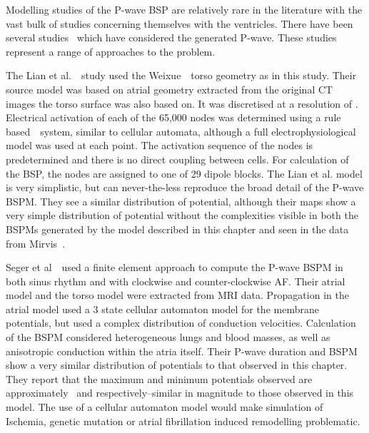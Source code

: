 Modelling studies of the P-wave BSP are relatively rare in the literature with
the vast bulk of studies concerning themselves with the ventricles.
There have been several
studies~\cite{Lian2002,Seger2004,Oosterom2005,vanDam2005} which have considered
the generated P-wave.
These studies represent a range of approaches to the problem.

The Lian et al.~\cite{Lian2002}\ study used the Weixue~\cite{Lu1993,Weixue1996}\ torso
geometry as in this study.
Their source model was based on atrial geometry extracted from the original CT
images the torso surface was also based on.
It was discretised at a resolution of .
Electrical activation of each of the 65,000 nodes was determined using a rule
based~\cite{Lu1993}\ system, similar to cellular automata, although a full
electrophysiological model was used at each point.
The activation sequence of the nodes is predetermined and there is no direct
coupling between cells.
For calculation of the BSP, the nodes are assigned to one of 29 dipole blocks.
The Lian et al. model is very simplistic, but can never-the-less reproduce the
broad detail of the P-wave BSPM.
They see a similar distribution of potential, although their maps show a very
simple distribution of potential without the complexities visible in both the
BSPMs generated by the model described in this chapter and seen in the data from
Mirvis~\cite{Mirvis1980}.

Seger et al~\cite{Seger2004}\ used a finite element approach to compute the
P-wave BSPM in both sinus rhythm and with clockwise and counter-clockwise AF.
Their atrial model and the torso model were extracted from MRI data.
Propagation in the atrial model used a 3 state cellular automaton model for the
membrane potentials, but used a complex distribution of conduction velocities.
Calculation of the BSPM considered heterogeneous lungs and blood masses, as well
as anisotropic conduction within the atria itself.
Their P-wave duration and BSPM show a very similar distribution of potentials to
that observed in this chapter.
They report that the maximum and minimum potentials observed are approximately
\ and  respectively--similar in magnitude to those observed
in this model.
The use of a cellular automaton model would make simulation of Ischemia, genetic
mutation or atrial fibrillation induced remodelling problematic.


